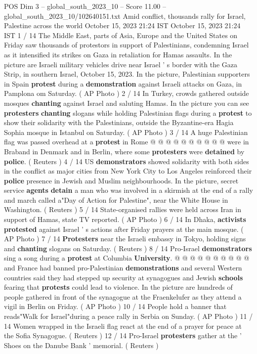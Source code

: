 \begin{textsample}{POS Dim 3 – global\_south\_2023\_10 – Score 11.00 – global\_south\_2023\_10/102640151.txt}  \label{ex:f3_pos_432}
Amid conflict, thousands rally for Israel, Palestine across the world October 15, 2023 21:24 IST October 15, 2023 21:24 IST 1 / 14 The Middle East, parts of Asia, Europe and the United States on Friday saw thousands of protestors in support of Palestinians, condemning Israel as it intensified its strikes on Gaza in retaliation for Hamas assaults.
In the picture are Israeli military vehicles drive near Israel ' s border with the Gaza Strip, in southern Israel, October 15, 2023.
In the picture, Palestinian supporters in Spain \textbf{protest} during a \textbf{demonstration} against Israeli attacks on Gaza, in Pamplona om Saturday. ( AP Photo ) 2 / 14 In Turkey, crowds gathered outside mosques \textbf{chanting} against Israel and saluting Hamas.
In the picture you can see \textbf{protesters} \textbf{chanting} slogans while holding Palestinian flags during a \textbf{protest} to show their solidarity with the Palestinians, outside the Byzantine-era Hagia Sophia mosque in Istanbul on Saturday. ( AP Photo ) 3 / 14 A huge Palestinian flag was passed overhead at a \textbf{protest} in Rome @ @ @ @ @ @ @ @ @ @ were in Braband in Denmark and in Berlin, where some \textbf{protesters} were \textbf{detained} by \textbf{police}. ( Reuters ) 4 / 14 US \textbf{demonstrators} showed solidarity with both sides in the conflict as major cities from New York City to Los Angeles reinforced their \textbf{police} presence in Jewish and Muslim neighbourhoods.
In the picture, secret service \textbf{agents} \textbf{detain} a man who was involved in a skirmish at the end of a rally and march called a"Day of Action for Palestine", near the White House in Washington. ( Reuters ) 5 / 14 State-organised rallies were held across Iran in support of Hamas, state TV reported. ( AP Photo ) 6 / 14 In Dhaka, \textbf{activists} \textbf{protested} against Israel ' s actions after Friday prayers at the main mosque. ( AP Photo ) 7 / 14 \textbf{Protesters} near the Israeli embassy in Tokyo, holding signs and \textbf{chanting} slogans on Saturday. ( Reuters ) 8 / 14 Pro-Israel \textbf{demonstrators} sing a song during a \textbf{protest} at Columbia \textbf{University}. @ @ @ @ @ @ @ @ @ @ and France had banned pro-Palestinian \textbf{demonstrations} and several Western countries said they had stepped up security at synagogues and Jewish \textbf{schools} fearing that \textbf{protests} could lead to violence.
In the picture are hundreds of people gathered in front of the synagogue at the Fraenkelufer as they attend a vigil in Berlin on Friday. ( AP Photo ) 10 / 14 People hold a banner that reads"Walk for Israel"during a peace rally in Serbia on Sunday. ( AP Photo ) 11 / 14 Women wrapped in the Israeli flag react at the end of a prayer for peace at the Sofia Synagogue. ( Reuters ) 12 / 14 Pro-Israel \textbf{protesters} gather at the ' Shoes on the Danube Bank ' memorial. ( Reuters )

\end{textsample}
